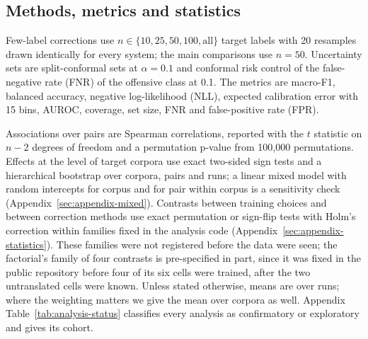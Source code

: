 \subsection{Methods, metrics and statistics}
\label{sec:protocol}

Few-label corrections use $n \in \{10, 25, 50, 100, \text{all}\}$ target labels with 20 resamples drawn identically
for every system; the main comparisons use $n = 50$. Uncertainty sets are split-conformal sets at $\alpha = 0.1$ and
conformal risk control \citep{angelopoulos2024crc} of the false-negative rate (FNR) of the offensive class at 0.1. The
metrics are macro-F1, balanced accuracy, negative log-likelihood (NLL), expected calibration error with 15 bins, AUROC,
coverage, set size, FNR and false-positive rate (FPR).

Associations over pairs are Spearman correlations, reported with the $t$ statistic on $n - 2$ degrees of freedom and a
permutation p-value from 100{,}000 permutations. Effects at the level of target corpora use exact two-sided sign tests
and a hierarchical bootstrap over corpora, pairs and runs; a linear mixed model with random intercepts for corpus and
for pair within corpus is a sensitivity check (Appendix~\ref{sec:appendix-mixed}). Contrasts between training choices
and between correction methods use exact permutation or sign-flip tests with Holm's correction \citep{holm1979} within
families fixed in the analysis code (Appendix~\ref{sec:appendix-statistics}). These families were not registered
before the data were seen; the factorial's family of four contrasts is pre-specified in part, since it was fixed in
the public repository before four of its six cells were trained, after the two untranslated cells were known. Unless stated otherwise,
means are over runs; where the weighting matters we give the mean over corpora as well. Appendix
Table~\ref{tab:analysis-status} classifies every analysis as confirmatory or exploratory and gives its cohort.
